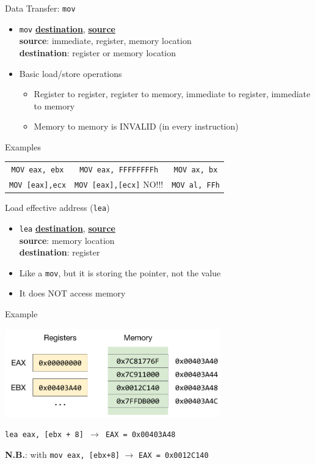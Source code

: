 \documentclass[]{beamer}
\begin{document}
\begin{frame}{Data Transfer: {\tt mov}}
  \begin{itemize}
  \item {\tt mov} \underline{\textbf{destination}}, \underline{\textbf{source}}\\
        \textbf{source}: immediate, register, memory location\\
	\textbf{destination}: register or memory location\\
  \item Basic load/store operations
  \begin{itemize}
  	\item Register to register, register to memory, immediate to register, immediate to memory
  	\item Memory to memory is INVALID (in every instruction)
  \end{itemize}
  \end{itemize}

  \begin{block}{Examples}
  	\centering
      \begin{tabular}{c|c|c}
        {\tt MOV eax, ebx} & {\tt MOV eax, FFFFFFFFh} & {\tt MOV ax, bx}\\[.4em]
        {\tt MOV [eax],ecx} & {\tt MOV [eax],[ecx]} \color{red}NO!!! & {\tt MOV al, FFh}\\
      \end{tabular}
  \end{block}
  
\end{frame}

\begin{frame}{Load effective address ({\tt lea})}
  \begin{itemize}
  		\item{{\tt lea} \underline{\textbf{destination}}, \underline{\textbf{source}}}\\
  		\textbf{source}: memory location\\
    	\textbf{destination}: register\\
  		\item{Like a {\tt mov}, but it is storing the pointer, not the value}
  		\item \alert{It does NOT access memory}
  \end{itemize}

  \begin{block}{Example}
  \par\noindent{}
  \centerline{\includegraphics[width=0.7\textwidth]{images/x86-lea}}
  \centerline{\tt lea eax, [ebx + 8] $\rightarrow$ \texttt{EAX = 0x00403A48}}
  \centerline{\textbf{N.B.}: with {\tt mov eax, [ebx+8]} $\rightarrow$ {\tt EAX = 0x0012C140}}
   \end{block}
\end{frame}
\end{document}
